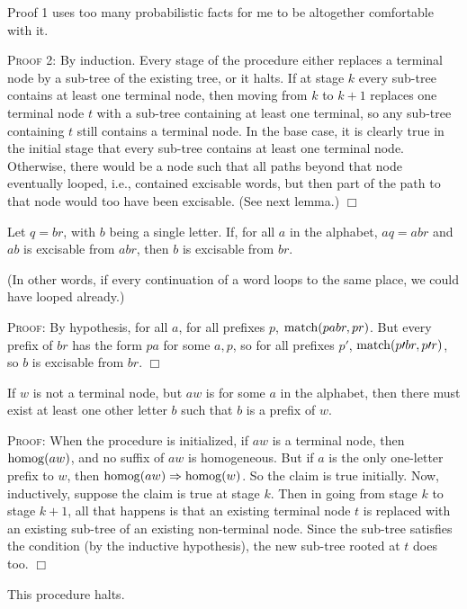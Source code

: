 \documentclass[../new-procedure.tex]{subfiles}
\begin{document}
Proof 1 uses too many probabilistic facts for me to be altogether comfortable
with it.

\textsc{Proof 2:} By induction.  Every stage of the procedure either replaces a
terminal node by a sub-tree of the existing tree, or it halts.  If at stage $k$
every sub-tree contains at least one terminal node, then moving from $k$ to
$k+1$ replaces one terminal node $t$ with a sub-tree containing at least one
terminal, so any sub-tree containing $t$ still contains a terminal node.  In
the base case, it is clearly true in the initial stage that every sub-tree
contains at least one terminal node.  Otherwise, there would be a node such
that all paths beyond that node eventually looped, i.e., contained excisable
words, but then part of the path to that node would too have been excisable.
(See next lemma.)  $\Box$

\begin{lemma}
  Let $q = br$, with $b$ being a single letter.  If, for all $a$ in the
  alphabet, $aq = abr$ and $ab$ is excisable from $abr$, then $b$ is excisable
  from $br$.
\end{lemma}
(In other words, if every continuation of a word loops to the same place, we
could have looped already.)

\textsc{Proof:} By hypothesis, for all $a$, for all prefixes $p$, $\mathrm{match}(pabr,
pr)$.  But every prefix of $br$ has the form $pa$ for some $a, p$, so for all
prefixes $p{\prime}$, $\mathrm{match}(p\prime br, p\prime r)$, so $b$ is excisable from
$br$.  $\Box$

\begin{proposition}
  If $w$ is not a terminal node, but $aw$ is for some $a$ in the alphabet, then
  there must exist at least one other letter $b$ such that $b$ is a prefix of
  $w$.
\end{proposition}

\textsc{Proof:} When the procedure is initialized, if $aw$ is a terminal node,
then $\mathrm{homog}(aw)$, and no suffix of $aw$ is homogeneous.  But if $a$ is the
only one-letter prefix to $w$, then $\mathrm{homog}(aw) \Rightarrow \mathrm{homog}(w)$.  So the
claim is true initially.  Now, inductively, suppose the claim is true at stage
$k$.  Then in going from stage $k$ to stage $k+1$, all that happens is that an
existing terminal node $t$ is replaced with an existing sub-tree of an existing
non-terminal node.  Since the sub-tree satisfies the condition (by the
inductive hypothesis), the new sub-tree rooted at $t$ does too. $\Box$

\begin{proposition}
This procedure halts.
\end{proposition}
\end{document}

